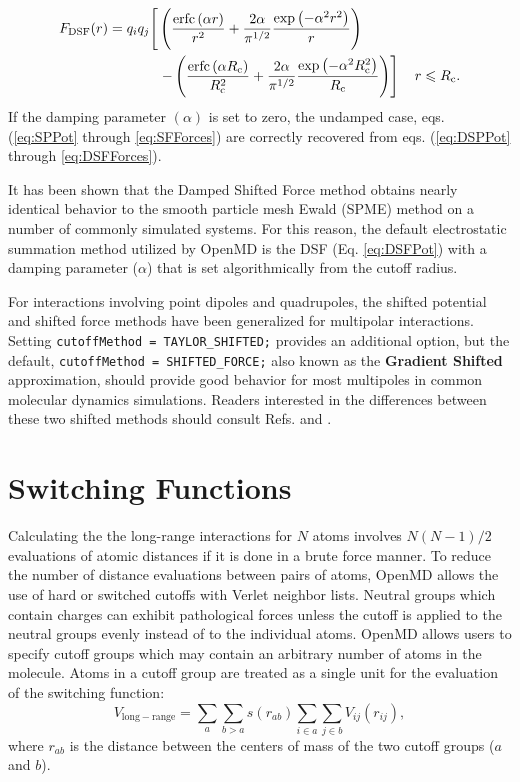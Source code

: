 \documentclass[letterpaper]{report}
\begin{document}
\begin{equation}
\begin{split}
F_\mathrm{DSF}(r) =
q_iq_j\Biggr{[}&\left(\frac{\textrm{erfc}\left(\alpha r\right)}{r^2}+\frac{2\alpha}{\pi^{1/2}}\frac{\exp{\left(-\alpha^2r^2\right)}}{r}\right) \\ &\left.-\left(\frac{\textrm{erfc}\left(\alpha R_{\textrm{c}}\right)}{R_{\textrm{c}}^2}+\frac{2\alpha}{\pi^{1/2}}\frac{\exp{\left(-\alpha^2R_{\textrm{c}}^2
\right)}}{R_{\textrm{c}}}\right)\right] \quad r\leqslant R_\textrm{c}.
\label{eq:DSFForces}
\end{split}
\end{equation}
If the damping parameter $(\alpha)$ is set to zero, the undamped case,
eqs. (\ref{eq:SPPot} through \ref{eq:SFForces}) are correctly
recovered from eqs. (\ref{eq:DSPPot} through \ref{eq:DSFForces}).

It has been shown that the Damped Shifted Force method obtains nearly
identical behavior to the smooth particle mesh Ewald (SPME)
method on a number of commonly simulated systems.\cite{Fennell06}  For
this reason, the default electrostatic summation method utilized by
OpenMD is the DSF (Eq. \ref{eq:DSFPot}) with a damping parameter
($\alpha$) that is set algorithmically from the cutoff radius.

For interactions involving point dipoles and quadrupoles, the shifted potential and shifted force methods have been generalized for multipolar interactions.\cite{Lamichhane:2014yg,Lamichhane:2014eu,Lamichhane:2016uq} 
Setting  {\tt cutoffMethod = TAYLOR\_SHIFTED;} provides an additional option, but the default, {\tt cutoffMethod = SHIFTED\_FORCE;} also known as the \textbf{Gradient Shifted} approximation, should provide good behavior for most multipoles in common molecular dynamics simulations.  Readers interested in the differences between these two shifted methods should consult Refs.  and .

\section{\label{section:cutoffGroups}Switching Functions}

Calculating the the long-range interactions for $N$ atoms involves
$N(N-1)/2$ evaluations of atomic distances if it is done in a brute
force manner.  To reduce the number of distance evaluations between
pairs of atoms, OpenMD allows the use of hard or switched
cutoffs with Verlet neighbor lists.\cite{Allen87} Neutral groups which
contain charges can exhibit pathological forces unless the cutoff is
applied to the neutral groups evenly instead of to the individual
atoms.\cite{leach01:mm} OpenMD allows users to specify cutoff
groups which may contain an arbitrary number of atoms in the molecule.
Atoms in a cutoff group are treated as a single unit for the
evaluation of the switching function:
\begin{equation}
V_{\mathrm{long-range}} = \sum_{a} \sum_{b>a} s(r_{ab}) \sum_{i \in a} \sum_{j \in b} V_{ij}(r_{ij}),
\end{equation}
where $r_{ab}$ is the distance between the centers of mass of the two
cutoff groups ($a$ and $b$).
\end{document}
